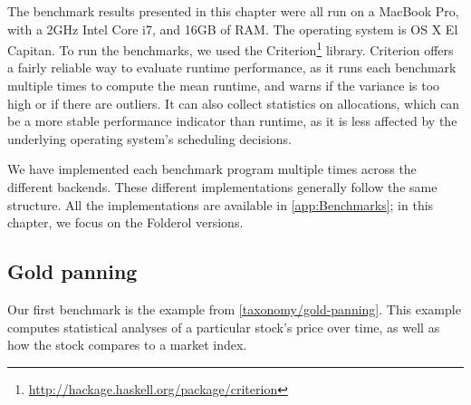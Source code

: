 The benchmark results presented in this chapter were all run on a MacBook Pro, with a 2GHz Intel Core i7, and 16GB of RAM.
The operating system is OS X El Capitan.
To run the benchmarks, we used the Criterion\footnote{\url{http://hackage.haskell.org/package/criterion}} library.
Criterion offers a fairly reliable way to evaluate runtime performance, as it runs each benchmark multiple times to compute the mean runtime, and warns if the variance is too high or if there are outliers.
It can also collect statistics on allocations, which can be a more stable performance indicator than runtime, as it is less affected by the underlying operating system's scheduling decisions.

We have implemented each benchmark program multiple times across the different backends.
These different implementations generally follow the same structure.
All the implementations are available in \cref{app:Benchmarks}; in this chapter, we focus on the Folderol versions.

\subsection{Gold panning}

Our first benchmark is the \Hs@priceAnalyses@ example from \cref{taxonomy/gold-panning}.
This example computes statistical analyses of a particular stock's price over time, as well as how the stock compares to a market index.


